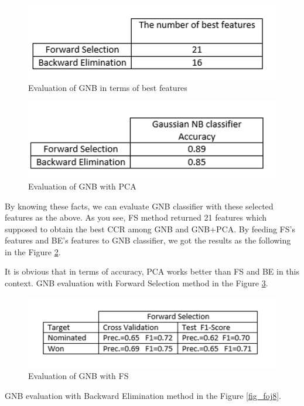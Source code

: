 \documentclass[journal,transmag]{IEEEtran}
\begin{document}
\begin{figure}
\includegraphics[scale=.35]{foj5.png}
 \caption{Evaluation of GNB in terms of best features}
\label{fig_foj5}
\end{figure}

\begin{figure}
\includegraphics[scale=.4]{foj6.png}
 \caption{Evaluation of GNB with PCA}
\label{fig_foj6}
\end{figure}
By knowing these facts, we can evaluate GNB classifier with these selected features as the above. As you see, FS method returned 21 features which supposed to obtain the best CCR among GNB and GNB+PCA. By feeding FS’s features and BE’s features to GNB classifier, we got the results as the following in the Figure \ref{fig_foj6}.

It is obvious that in terms of accuracy, PCA works better than FS and BE in this context. GNB evaluation with Forward Selection method in the Figure \ref{fig_foj7}.

\begin{figure}
\includegraphics[scale=.35]{foj7.png}
 \caption{Evaluation of GNB with FS}
\label{fig_foj7}
\end{figure}
GNB evaluation with Backward Elimination method in the Figure \ref{fig_foj8}.
\end{document}
